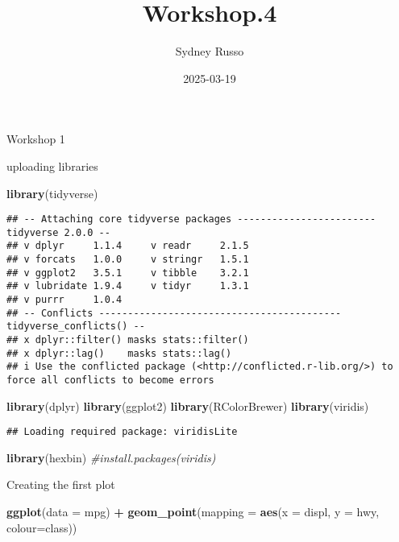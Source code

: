 \documentclass[
]{article}
\title{Workshop.4}
\author{Sydney Russo}
\date{2025-03-19}
\newenvironment{Shaded}{\begin{snugshade}}{\end{snugshade}}
\newcommand{\AttributeTok}[1]{\textcolor[rgb]{0.13,0.29,0.53}{#1}}
\newcommand{\CommentTok}[1]{\textcolor[rgb]{0.56,0.35,0.01}{\textit{#1}}}
\newcommand{\FunctionTok}[1]{\textcolor[rgb]{0.13,0.29,0.53}{\textbf{#1}}}
\newcommand{\NormalTok}[1]{#1}
\newcommand{\SpecialCharTok}[1]{\textcolor[rgb]{0.81,0.36,0.00}{\textbf{#1}}}
\begin{document}
\maketitle

Workshop 1

uploading libraries

\begin{Shaded}
\begin{Highlighting}[]
\FunctionTok{library}\NormalTok{(tidyverse)}
\end{Highlighting}
\end{Shaded}

\begin{verbatim}
## -- Attaching core tidyverse packages ------------------------ tidyverse 2.0.0 --
## v dplyr     1.1.4     v readr     2.1.5
## v forcats   1.0.0     v stringr   1.5.1
## v ggplot2   3.5.1     v tibble    3.2.1
## v lubridate 1.9.4     v tidyr     1.3.1
## v purrr     1.0.4     
## -- Conflicts ------------------------------------------ tidyverse_conflicts() --
## x dplyr::filter() masks stats::filter()
## x dplyr::lag()    masks stats::lag()
## i Use the conflicted package (<http://conflicted.r-lib.org/>) to force all conflicts to become errors
\end{verbatim}

\begin{Shaded}
\begin{Highlighting}[]
\FunctionTok{library}\NormalTok{(dplyr)}
\FunctionTok{library}\NormalTok{(ggplot2)}
\FunctionTok{library}\NormalTok{(RColorBrewer)}
\FunctionTok{library}\NormalTok{(viridis)}
\end{Highlighting}
\end{Shaded}

\begin{verbatim}
## Loading required package: viridisLite
\end{verbatim}

\begin{Shaded}
\begin{Highlighting}[]
\FunctionTok{library}\NormalTok{(hexbin)}
\CommentTok{\#install.packages(\textquotesingle{}viridis\textquotesingle{})}
\end{Highlighting}
\end{Shaded}

Creating the first plot

\begin{Shaded}
\begin{Highlighting}[]
\FunctionTok{ggplot}\NormalTok{(}\AttributeTok{data =}\NormalTok{ mpg) }\SpecialCharTok{+} 
  \FunctionTok{geom\_point}\NormalTok{(}\AttributeTok{mapping =} \FunctionTok{aes}\NormalTok{(}\AttributeTok{x =}\NormalTok{ displ, }\AttributeTok{y =}\NormalTok{ hwy, }\AttributeTok{colour=}\NormalTok{class))}
\end{Highlighting}
\end{Shaded}
\end{document}
